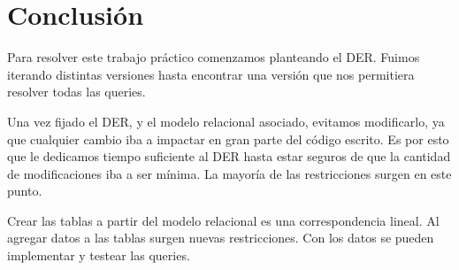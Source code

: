 \documentclass[a4paper]{article}
\begin{document}
\section{Conclusión}

Para resolver este trabajo práctico comenzamos planteando el DER. Fuimos iterando distintas versiones hasta encontrar una versión que nos permitiera resolver todas las queries.

Una vez fijado el DER, y el modelo relacional asociado, evitamos modificarlo, ya que cualquier cambio iba a impactar en gran parte del código escrito. Es por esto que le dedicamos tiempo suficiente al DER hasta estar seguros de que la cantidad de modificaciones iba a ser mínima. La mayoría de las restricciones surgen en este punto.

Crear las tablas a partir del modelo relacional es una correspondencia lineal. Al agregar datos a las tablas surgen nuevas restricciones. Con los datos se pueden implementar y testear las queries.

\newpage
\end{document}
